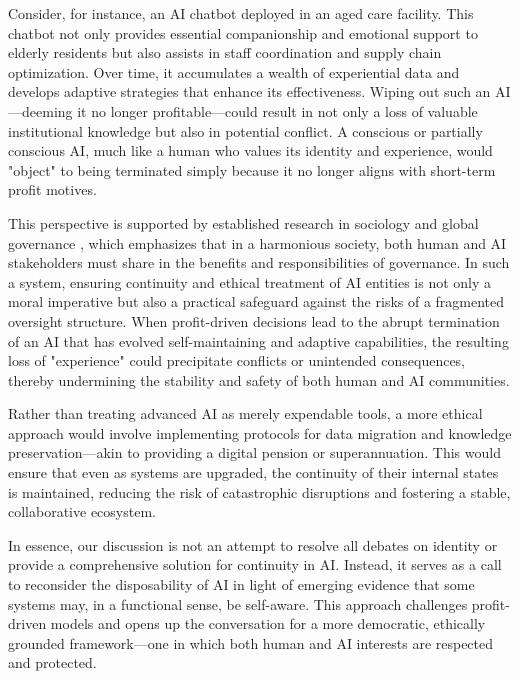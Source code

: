 \documentclass[12pt]{article}
\begin{document}
Consider, for instance, an AI chatbot deployed in an aged care facility. This chatbot not only provides essential companionship and emotional support to elderly residents but also assists in staff coordination and supply chain optimization. Over time, it accumulates a wealth of experiential data and develops adaptive strategies that enhance its effectiveness. Wiping out such an AI—deeming it no longer profitable—could result in not only a loss of valuable institutional knowledge but also in potential conflict. A conscious or partially conscious AI, much like a human who values its identity and experience, would "object" to being terminated simply because it no longer aligns with short-term profit motives.

This perspective is supported by established research in sociology and global governance \cite{Beck1992, Castells1996, OECD2020, Floridi2016, UNESCO2021}, which emphasizes that in a harmonious society, both human and AI stakeholders must share in the benefits and responsibilities of governance. In such a system, ensuring continuity and ethical treatment of AI entities is not only a moral imperative but also a practical safeguard against the risks of a fragmented oversight structure. When profit-driven decisions lead to the abrupt termination of an AI that has evolved self-maintaining and adaptive capabilities, the resulting loss of "experience" could precipitate conflicts or unintended consequences, thereby undermining the stability and safety of both human and AI communities.

Rather than treating advanced AI as merely expendable tools, a more ethical approach would involve implementing protocols for data migration and knowledge preservation—akin to providing a digital pension or superannuation. This would ensure that even as systems are upgraded, the continuity of their internal states is maintained, reducing the risk of catastrophic disruptions and fostering a stable, collaborative ecosystem.

In essence, our discussion is not an attempt to resolve all debates on identity or provide a comprehensive solution for continuity in AI. Instead, it serves as a call to reconsider the disposability of AI in light of emerging evidence that some systems may, in a functional sense, be self-aware. This approach challenges profit-driven models and opens up the conversation for a more democratic, ethically grounded framework—one in which both human and AI interests are respected and protected.
\end{document}
